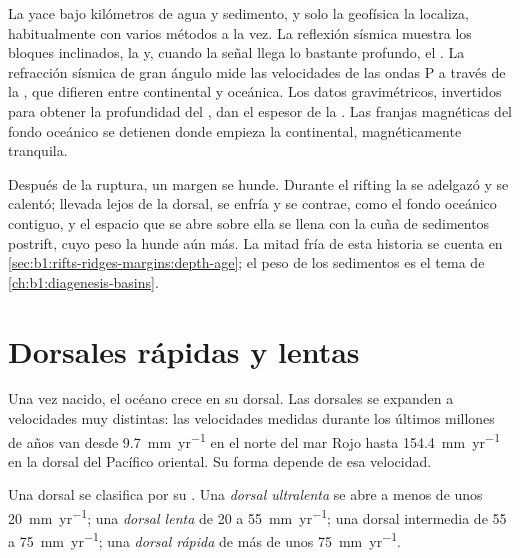 \begin{inthefield}
La  yace bajo kilómetros de agua y sedimento, y solo la geofísica la localiza, habitualmente con varios
métodos a la vez. La reflexión sísmica muestra los bloques inclinados, la  y, cuando la señal llega lo bastante
profundo, el . La refracción sísmica de gran ángulo mide las velocidades de las ondas P a través de la , que difieren entre
 continental y oceánica. Los datos gravimétricos, invertidos para obtener la profundidad del , dan el espesor de la .
Las franjas magnéticas del fondo oceánico se detienen donde empieza la  continental, magnéticamente tranquila.
\end{inthefield}

Después de la ruptura, un margen se hunde. Durante el rifting la  se adelgazó y se calentó; llevada lejos de la dorsal, se enfría
y se contrae, como el fondo oceánico contiguo, y el espacio que se abre sobre ella se llena con la cuña de sedimentos postrift, cuyo peso la
hunde aún más. La mitad fría de esta historia se cuenta en \cref{sec:b1:rifts-ridges-margins:depth-age}; el peso de los sedimentos es el
tema de \cref{ch:b1:diagenesis-basins}.

\section{Dorsales rápidas y lentas}

Una vez nacido, el océano crece en su dorsal. Las dorsales se expanden a velocidades muy distintas: las velocidades medidas durante los
últimos millones de años van desde \qty{9.7}{mm.yr^{-1}} en el norte del mar Rojo hasta \qty{154.4}{mm.yr^{-1}} en la dorsal del Pacífico
oriental. Su forma depende de esa velocidad.

\begin{definition}\label{def:b1:rifts-ridges-margins:ridge-classes}
Una dorsal se clasifica por su . Una \emph{dorsal ultralenta} se abre a menos de unos
\qty{20}{mm.yr^{-1}}; una \emph{dorsal lenta} de 20 a \qty{55}{mm.yr^{-1}}; una dorsal intermedia de 55 a
\qty{75}{mm.yr^{-1}}; una \emph{dorsal rápida} de más de unos \qty{75}{mm.yr^{-1}}.
\end{definition}

